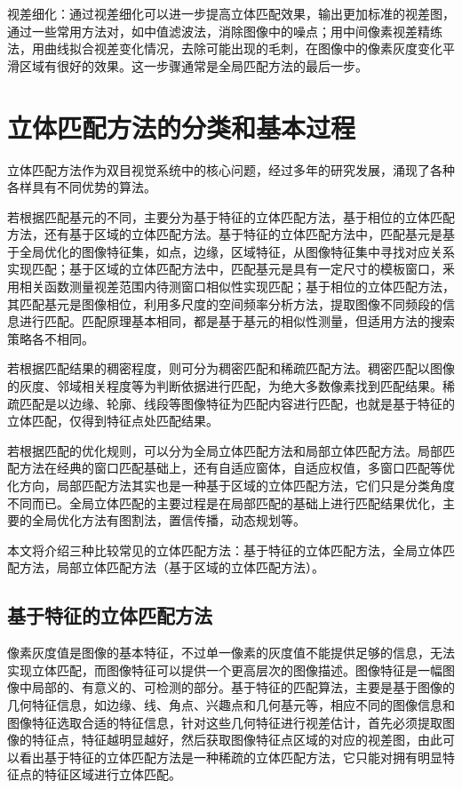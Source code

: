 视差细化：通过视差细化可以进一步提高立体匹配效果，输出更加标准的视差图，通过一些常用方法对，如中值滤波法，消除图像中的噪点；用中间像素视差精练法，用曲线拟合视差变化情况，去除可能出现的毛刺，在图像中的像素灰度变化平滑区域有很好的效果。这一步骤通常是全局匹配方法的最后一步。

\section{立体匹配方法的分类和基本过程}

立体匹配方法作为双目视觉系统中的核心问题，经过多年的研究发展，涌现了各种各样具有不同优势的算法。

若根据匹配基元的不同，主要分为基于特征的立体匹配方法，基于相位的立体匹配方法，还有基于区域的立体匹配方法。基于特征的立体匹配方法中，匹配基元是基于全局优化的图像特征集，如点，边缘，区域特征，从图像特征集中寻找对应关系实现匹配；基于区域的立体匹配方法中，匹配基元是具有一定尺寸的模板窗口，釆用相关函数测量视差范围内待测窗口相似性实现匹配；基于相位的立体匹配方法，其匹配基元是图像相位，利用多尺度的空间频率分析方法，提取图像不同频段的信息进行匹配。匹配原理基本相同，都是基于基元的相似性测量，但适用方法的搜索策略各不相同。

若根据匹配结果的稠密程度，则可分为稠密匹配和稀疏匹配方法。稠密匹配以图像的灰度、邻域相关程度等为判断依据进行匹配，为绝大多数像素找到匹配结果。稀疏匹配是以边缘、轮廓、线段等图像特征为匹配内容进行匹配，也就是基于特征的立体匹配，仅得到特征点处匹配结果。

若根据匹配的优化规则，可以分为全局立体匹配方法和局部立体匹配方法。局部匹配方法在经典的窗口匹配基础上，还有自适应窗体，自适应权值，多窗口匹配等优化方向，局部匹配方法其实也是一种基于区域的立体匹配方法，它们只是分类角度不同而已。全局立体匹配的主要过程是在局部匹配的基础上进行匹配结果优化，主要的全局优化方法有图割法，置信传播，动态规划等。


本文将介绍三种比较常见的立体匹配方法：基于特征的立体匹配方法，全局立体匹配方法，局部立体匹配方法（基于区域的立体匹配方法）。

\subsection{基于特征的立体匹配方法}
像素灰度值是图像的基本特征，不过单一像素的灰度值不能提供足够的信息，无法实现立体匹配，而图像特征可以提供一个更高层次的图像描述。图像特征是一幅图像中局部的、有意义的、可检测的部分。基于特征的匹配算法，主要是基于图像的几何特征信息，如边缘、线、角点、兴趣点和几何基元等，相应不同的图像信息和图像特征选取合适的特征信息，针对这些几何特征进行视差估计，首先必须提取图像的特征点，特征越明显越好，然后获取图像特征点区域的对应的视差图，由此可以看出基于特征的立体匹配方法是一种稀疏的立体匹配方法，它只能对拥有明显特征点的特征区域进行立体匹配。

